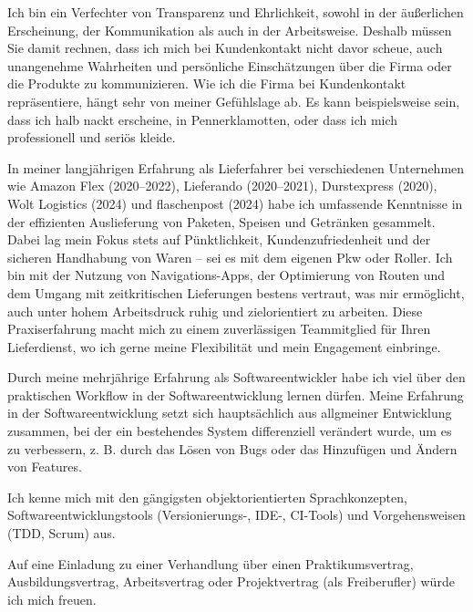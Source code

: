 		Ich bin ein Verfechter von Transparenz und Ehrlichkeit, sowohl in der äußerlichen Erscheinung, der Kommunikation als auch in der Arbeitsweise.
		Deshalb müssen Sie damit rechnen, dass ich mich bei Kundenkontakt nicht davor scheue, auch unangenehme Wahrheiten und persönliche Einschätzungen über die Firma oder die Produkte zu kommunizieren.
		Wie ich die Firma bei Kundenkontakt repräsentiere, hängt sehr von meiner Gefühlslage ab.
		Es kann beispielsweise sein, dass ich halb nackt erscheine, in Pennerklamotten, oder dass ich mich professionell und seriös kleide.

		In meiner langjährigen Erfahrung als Lieferfahrer bei verschiedenen Unternehmen wie Amazon Flex (2020–2022), Lieferando (2020–2021), Durstexpress (2020), Wolt Logistics (2024) und flaschenpost (2024) habe ich umfassende Kenntnisse in der effizienten Auslieferung von Paketen, Speisen und Getränken gesammelt.
		Dabei lag mein Fokus stets auf Pünktlichkeit, Kundenzufriedenheit und der sicheren Handhabung von Waren – sei es mit dem eigenen Pkw oder Roller.
		Ich bin mit der Nutzung von Navigations-Apps, der Optimierung von Routen und dem Umgang mit zeitkritischen Lieferungen bestens vertraut, was mir ermöglicht, auch unter hohem Arbeitsdruck ruhig und zielorientiert zu arbeiten.
		Diese Praxiserfahrung macht mich zu einem zuverlässigen Teammitglied für Ihren Lieferdienst, wo ich gerne meine Flexibilität und mein Engagement einbringe.

		Durch meine mehrjährige Erfahrung als Softwareentwickler habe ich viel über den praktischen Workflow in der Softwareentwicklung lernen dürfen.
		Meine Erfahrung in der Softwareentwicklung setzt sich hauptsächlich aus allgmeiner Entwicklung zusammen, bei der ein bestehendes System differenziell verändert wurde, um es zu verbessern, z. B. durch das Lösen von Bugs oder das Hinzufügen und Ändern von Features.

		Ich kenne mich mit den gängigsten objektorientierten Sprachkonzepten, Softwareentwicklungstools (Versionierungs-, IDE-, CI-Tools) und Vorgehensweisen (TDD, Scrum) aus.

		Auf eine Einladung zu einer Verhandlung über einen Praktikumsvertrag, Ausbildungsvertrag, Arbeitsvertrag oder Projektvertrag (als Freiberufler) würde ich mich freuen.
